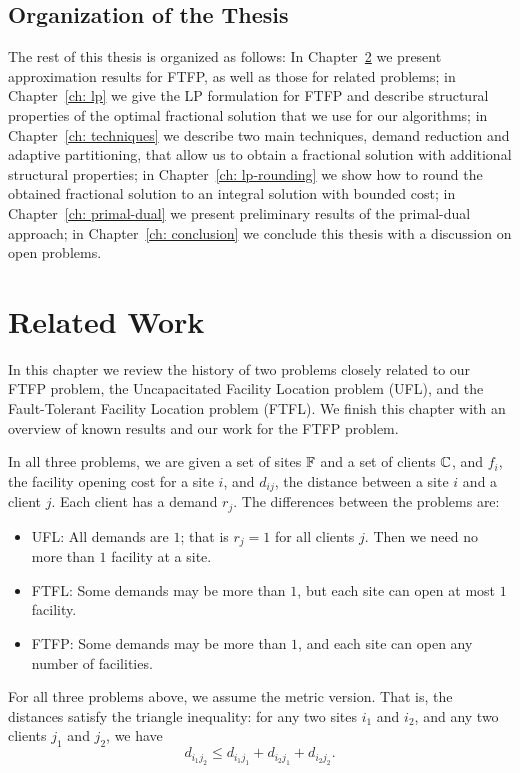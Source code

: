 \documentclass[oneside,final]{ucr}
\begin{document}
\section{Organization of the Thesis}
The rest of this thesis is organized as follows: In
Chapter~\ref{ch: related_work} we present approximation
results for FTFP, as well as those for related problems; in
Chapter~\ref{ch: lp} we give the LP formulation for FTFP and
describe structural properties of the optimal fractional
solution that we use for our algorithms; in Chapter~\ref{ch:
  techniques} we describe two main techniques, demand
reduction and adaptive partitioning, that allow us to obtain
a fractional solution with additional structural properties;
in Chapter~\ref{ch: lp-rounding} we show how to round the
obtained fractional solution to an integral solution with
bounded cost; in Chapter~\ref{ch: primal-dual} we present
preliminary results of the primal-dual approach; in
Chapter~\ref{ch: conclusion} we conclude this thesis with a
discussion on open problems.


\chapter{Related Work} \label{ch: related_work}

In this chapter we review the history of two problems
closely related to our FTFP problem, the Uncapacitated
Facility Location problem (UFL), and the Fault-Tolerant
Facility Location problem (FTFL).  We finish this chapter
with an overview of known results and our work for the FTFP
problem.

In all three problems, we are given a set of sites
$\mathbb{F}$ and a set of clients $\mathbb{C}$, and $f_i$,
the facility opening cost for a site $i$, and $d_{ij}$, the
distance between a site $i$ and a client $j$. Each client
has a demand $r_j$. The differences between the problems
are:
\begin{itemize}
\item{UFL}: All demands are $1$; that is $r_j=1$ for
  all clients $j$. Then we need no more than $1$ facility at
  a site.
\item{FTFL}: Some demands may be more than $1$, but
  each site can open at most $1$ facility.
\item{FTFP}: Some demands may be more than $1$, and each site
  can open any number of facilities.
\end{itemize}
For all three problems above, we assume the metric
version. That is, the distances satisfy the triangle
inequality: for any two sites $i_1$ and $i_2$, and any two
clients $j_1$ and $j_2$, we have
\begin{equation*}
  d_{i_1 j_2} \leq d_{i_1 j_1} + d_{i_2 j_1} + d_{i_2 j_2}.
\end{equation*}
\end{document}
